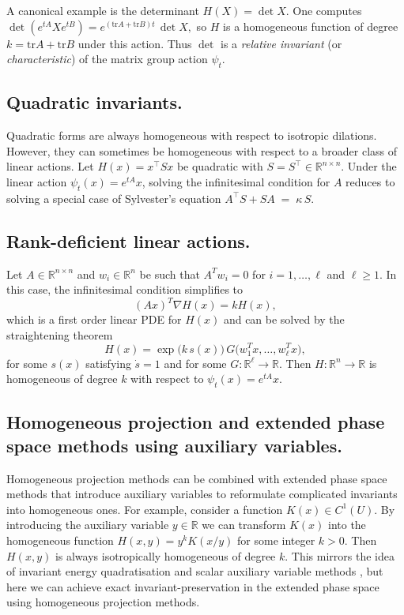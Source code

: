 \documentclass[final,3p,times]{elsarticle}
\newcommand{\R}{\mathbb{R}}
\newcommand{\tr}{\mathrm{tr}}
\begin{document}
A canonical example is the determinant $H(X)=\det X$. One computes $ \det(e^{tA} X e^{tB}) = e^{(\tr A + \tr B)t}\,\det X,$ so $H$ is a homogeneous function of degree $k=\tr A+\tr B$ under this action. Thus $\det$ is a \emph{relative invariant} (or \emph{characteristic}) of the matrix group action $\psi_t$.

\subsection{Quadratic invariants.}
Quadratic forms are always homogeneous with respect to isotropic dilations. However, they can sometimes be homogeneous with respect to a broader class of linear actions. Let $H(x) = x^\top S x$ be quadratic with $S=S^\top \in \mathbb{R}^{n\times n}$. Under the linear action $\psi_t(x) = e^{tA}x$, solving the infinitesimal condition for $A$ reduces to solving a special case of Sylvester's equation $A^\top S + SA \;=\; \kappa\,S.$

\subsection{Rank-deficient linear actions.}
Let $A\in\R^{n\times n}$ and $w_i\in\R^{n}$ be such that $A^Tw_i=0$ for $i=1,\ldots,\ell$ and $\ell\ge 1$. In this case, the infinitesimal condition simplifies to $$(Ax)^T\nabla H(x)=k H(x),$$ which is a first order linear PDE for $H(x)$ and can be solved by the straightening theorem \cite{liveranidynamical}
$$H(x)=\exp\!\big(k\,s(x)\big)\,G\!\big(w_1^Tx,\dots,w_{\ell}^Tx\big),$$
for some $s(x)$ satisfying $\dot{s}=1$ and for some $G:\R^{\ell}\to\R$. Then $H:\R^n\to\R$ is homogeneous of degree $k$ with respect to $\psi_t(x)=e^{tA}x$.
\subsection{Homogeneous projection and extended phase space methods using auxiliary variables.}
Homogeneous projection methods can be combined with extended phase space methods that introduce auxiliary variables to reformulate complicated invariants into homogeneous ones. For example, consider a function $K(x)\in C^1(U)$. By introducing the auxiliary variable $y\in\R$ we can transform $K(x)$ into the homogeneous function $H(x,y) = y^k K(x/y)$ for some integer $k>0$. Then $H(x,y)$ is always isotropically homogeneous of degree $k$. This mirrors the idea of invariant energy quadratisation and scalar auxiliary variable methods \cite{shen2018scalar, zhang2020novel}, but here we can achieve exact invariant-preservation in the extended phase space using homogeneous projection methods.
\end{document}
